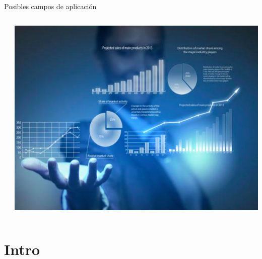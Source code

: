 \documentclass{bredelebeamer}
\begin{document}
\begin{frame}{Posibles campos de aplicación}
\begin{columns}
\begin{column}{0.3\textwidth}
\begin{center}
\end{center}
\end{column}
\begin{column}{0.23\textwidth}
\begin{center}
\includegraphics[scale=0.18]{images/ap6.png}
\end{center}
\end{column}
\end{columns}
\end{frame}




\section{Intro}
\end{document}
